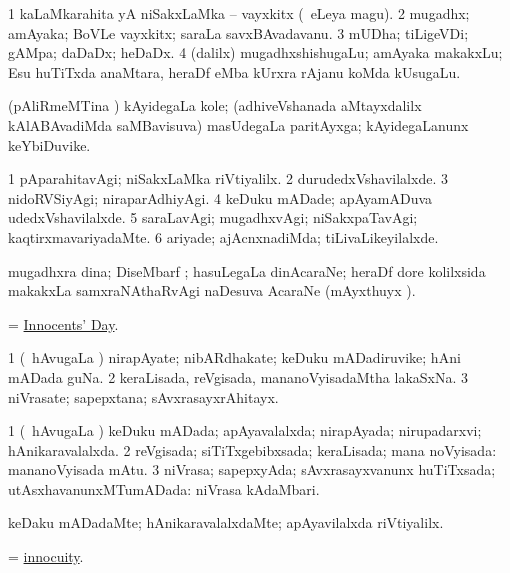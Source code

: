 \bentry
{}
\gl{\nA}
\bmng
\bnum
\num{1} kaLaMkarahita yA niSakxLaMka -- vayxkitx (\kanmu\ eLeya magu). 
\num{2} mugadhx; amAyaka; BoVLe vayxkitx; saraLa savxBAvadavanu. 
\num{3} mUDha; tiLigeVDi; gAMpa; daDaDx; heDaDx. 
\num{4} (\bava dalilx) mugadhxshishugaLu; amAyaka makakxLu; Esu huTiTxda anaMtara, heraDf eMba kUrxra rAjanu koMda kUsugaLu. 
\enum
\emng

\noindent 
\gl{\pagu}
\bmng
{}  (pAliRmeMTina \ashi) kAyidegaLa kole; (adhiveVshanada aMtayxdalilx kAlABAvadiMda saMBavisuva) masUdegaLa paritAyxga; kAyidegaLanunx keYbiDuvike. 
\emng
\eentry

\bentry
{}
\gl{\kirxvi}
\bmng
\bnum
\num{1} pAparahitavAgi; niSakxLaMka riVtiyalilx. 
\num{2} durudedxVshavilalxde. 
\num{3} nidoRVSiyAgi; niraparAdhiyAgi. 
\num{4} keDuku mADade; apAyamADuva udedxVshavilalxde. 
\num{5} saraLavAgi; mugadhxvAgi; niSakxpaTavAgi; kaqtirxmavariyadaMte. 
\num{6} ariyade; ajAcnxnadiMda; tiLivaLikeyilalxde. 
\enum
\emng
\eentry

\bentry
{}
\gl{\nA}
\bmng
mugadhxra dina; DiseMbarf ; hasuLegaLa dinAcaraNe; heraDf dore kolilxsida makakxLa samxraNAthaRvAgi naDesuva AcaraNe (mAyxthuyx ). 
\emng

\noindent 
\gl{\pagu}
\bmng
{} = \hyperlink{Innocents' Day}{Innocents' Day}. 
\emng
\eentry

\bentry
{}
\gl{\nA}
\bmng
\bnum
\num{1} (\kanmu\ hAvugaLa \vi) nirapAyate; nibARdhakate; keDuku mADadiruvike; hAni mADada guNa. 
\num{2} keraLisada, reVgisada, mananoVyisadaMtha lakaSxNa. 
\num{3} niVrasate; sapepxtana; sAvxrasayxrAhitayx. 
\enum
\emng
\eentry

\bentry
{}
\gl{\gu}
\bmng
\bnum
\num{1} (\kanmu\ hAvugaLa \vi) keDuku mADada; apAyavalalxda; nirapAyada; nirupadarxvi; hAnikaravalalxda. 
\num{2} reVgisada; siTiTxgebibxsada; keraLisada; mana noVyisada:  mananoVyisada mAtu. 
\num{3} niVrasa; sapepxyAda; sAvxrasayxvanunx huTiTxsada; utAsxhavanunxMTumADada:  niVrasa kAdaMbari. 
\enum
\emng
\eentry

\bentry
{}
\gl{\kirxvi}
\bmng
keDaku mADadaMte; hAnikaravalalxdaMte; apAyavilalxda riVtiyalilx. 
\emng
\eentry

\bentry
{}
\gl{\nA}
\bmng
= \hyperlink{innocuity}{innocuity}. 
\emng
\eentry

